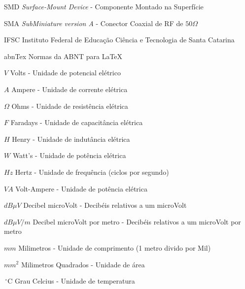 \documentclass{ifscTCC} %
\begin{document}
\begin{siglas}
   \item[SMD] \textit{Surface-Mount Device} - Componente Montado na Superfície
   \item[SMA] \textit{SubMiniature version A} - Conector Coaxial de RF de $50\Omega$
   \item[IFSC] Instituto Federal de Educação Ciência e Tecnologia de Santa Catarina
   \item[abnTex] Normas da ABNT para \LaTeX
   \end{siglas}

\begin{simbolos}
   \item[$V$] Volts - Unidade de potencial elétrico
   \item[$A$] Ampere - Unidade de corrente elétrica
   \item[$\Omega$] Ohms - Unidade de resistência elétrica
   \item[$F$] Faradays - Unidade de capacitância elétrica
   \item[$H$] Henry - Unidade de indutância elétrica
   \item[$W$] Watt's - Unidade de potência elétrica
   \item[$Hz$] Hertz - Unidade de frequência (ciclos por segundo)
   \item[$VA$] Volt-Ampere - Unidade de potência elétrica
   \item[$dB\mu V$] Decibel microVolt - Decibéis relativos a um microVolt
   \item[$dB\mu V/m$] Decibel microVolt por metro - Decibéis relativos a um microVolt por metro
   \item[$mm$] Milimetros - Unidade de comprimento (1 metro divido por Mil)
   \item[$mm^{2}$] Milimetros Quadrados - Unidade de área
   \item[$\,^{\circ}\mathrm{C}$] Grau Celcius - Unidade de temperatura
\end{simbolos}

\tableofcontents*
\cleardoublepage
\end{document}
